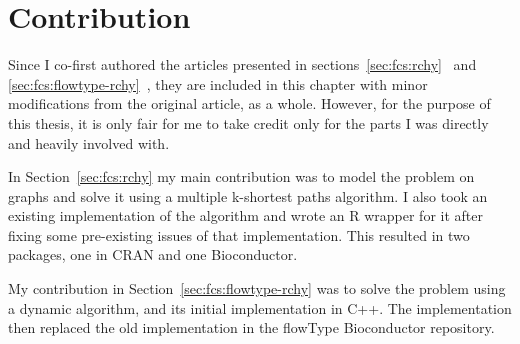 \section{Contribution}
Since I co-first authored the articles presented in sections~\ref{sec:fcs:rchy}~\cite{Aghaeepour2012a} and \ref{sec:fcs:flowtype-rchy}~\cite{o2014enhanced}, they are included in this chapter with minor modifications from the original article, as a whole. However, for the purpose of this thesis, it is only fair for me to take credit only for the parts I was directly and heavily involved with.

In Section~\ref{sec:fcs:rchy} my main contribution was to model the problem on graphs and solve it using a multiple k-shortest paths algorithm. I also took an existing implementation of the algorithm and wrote an R wrapper for it after fixing some pre-existing issues of that implementation. This resulted in two packages, one in CRAN and one Bioconductor.

My contribution in Section~\ref{sec:fcs:flowtype-rchy} was to solve the problem using a dynamic algorithm, and its initial implementation in C++. The implementation then replaced the old implementation in the flowType Bioconductor repository. 
